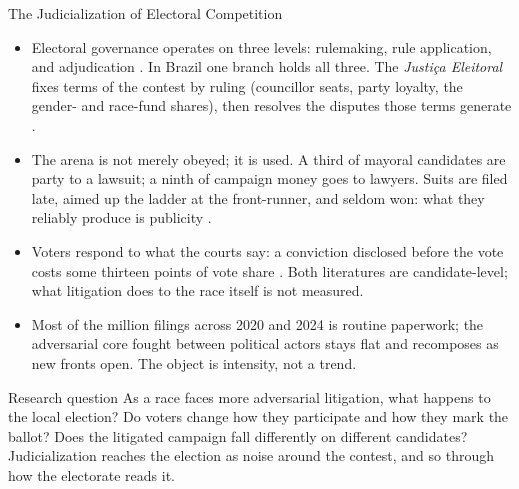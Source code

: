 
\begin{frame}{The Judicialization of Electoral Competition}
\hypertarget{src:motivation}{}
\small
\begin{itemize}\itemsep1pt
  \item Electoral governance operates on three levels: rulemaking, rule application, and adjudication . In Brazil one branch holds all three. The \emph{Justi\c{c}a Eleitoral} fixes terms of the contest by ruling (councillor seats, party loyalty, the gender- and race-fund shares), then resolves the disputes those terms generate .

  \item The arena is not merely obeyed; it is used. A third of mayoral candidates are party to a lawsuit; a ninth of campaign money goes to lawyers. Suits are filed late, aimed up the ladder at the front-runner, and seldom won: what they reliably produce is publicity .

  \item Voters respond to what the courts say: a conviction disclosed before the vote costs some thirteen points of vote share . Both literatures are candidate-level; what litigation does to the race itself is not measured.

  \item Most of the \TotalAllLawsuits{} million filings across 2020 and 2024 is routine paperwork; the \textcolor{myblue}{adversarial core} fought between political actors stays flat and recomposes as new fronts open. The object is \textcolor{myblue}{intensity}, not a trend.
\end{itemize}
\vspace{-2pt}
\begin{block}{Research question}
\footnotesize As a race faces more adversarial litigation, what happens to the local election? Do voters change how they participate and how they mark the ballot? Does the litigated campaign fall differently on different candidates? Judicialization reaches the election as noise around the contest, and so through how the electorate reads it.
\end{block}
\end{frame}
